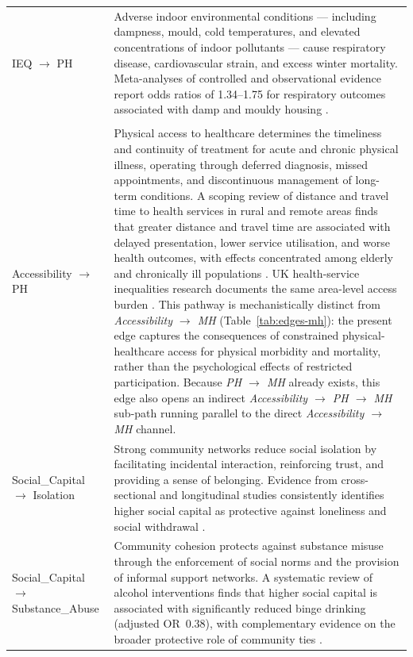 \begin{longtable}{@{}p{3.8cm}p{11.2cm}@{}}
\addlinespace
IEQ $\to$ PH
& Adverse indoor environmental conditions --- including dampness, mould, cold temperatures, and elevated concentrations of indoor pollutants --- cause respiratory disease, cardiovascular strain, and excess winter mortality. Meta-analyses of controlled and observational evidence report odds ratios of 1.34--1.75 for respiratory outcomes associated with damp and mouldy housing \citep{fisk_meta-analyses_2007, world_health_organization_who_2009, marmot_review_team_health_2011}. \\
\addlinespace
\multicolumn{2}{@{}l}{\textit{Social and Psychological Mediator edges}}\\
\addlinespace
Accessibility $\to$ PH & Physical access to healthcare determines the timeliness and continuity of treatment for acute and chronic physical illness, operating through deferred diagnosis, missed appointments, and discontinuous management of long-term conditions. A scoping review of distance and travel time to health services in rural and remote areas finds that greater distance and travel time are associated with delayed presentation, lower service utilisation, and worse health outcomes, with effects concentrated among elderly and chronically ill populations \citep{mseke_impact_2024}. UK health-service inequalities research documents the same area-level access burden \citep{lowther-payne_understanding_2023}. This pathway is mechanistically distinct from \textit{Accessibility $\to$ MH} (Table~\ref{tab:edges-mh}): the present edge captures the consequences of constrained physical-healthcare access for physical morbidity and mortality, rather than the psychological effects of restricted participation. Because \textit{PH $\to$ MH} already exists, this edge also opens an indirect \textit{Accessibility $\to$ PH $\to$ MH} sub-path running parallel to the direct \textit{Accessibility $\to$ MH} channel. \\
\addlinespace
Social\_Capital $\to$ Isolation
& Strong community networks reduce social isolation by facilitating incidental interaction, reinforcing trust, and providing a sense of belonging. Evidence from cross-sectional and longitudinal studies consistently identifies higher social capital as protective against loneliness and social withdrawal \citep{nyqvist_association_2016, holtlunstad_social_2024}. \\
\addlinespace
Social\_Capital $\to$ Substance\_Abuse
& Community cohesion protects against substance misuse through the enforcement of social norms and the provision of informal support networks. A systematic review of alcohol interventions finds that higher social capital is associated with significantly reduced binge drinking (adjusted OR~0.38), with complementary evidence on the broader protective role of community ties \citep{bryden_systematic_2013, weitzman_risk_2005}. \\

\end{longtable}
